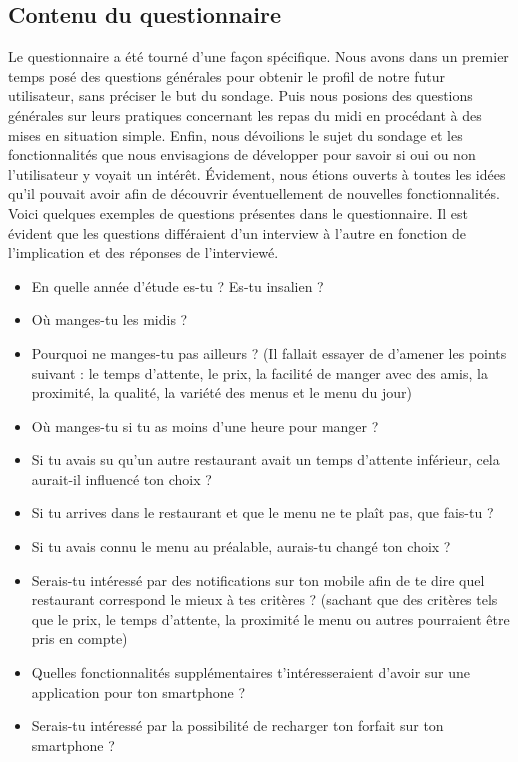 \subsection{Contenu du questionnaire}
Le questionnaire a été tourné d'une façon spécifique. Nous avons dans un 
premier temps posé des questions générales pour obtenir le profil de notre
futur utilisateur, sans préciser le but du sondage. Puis nous posions 
des questions générales sur leurs pratiques concernant les repas du midi
en procédant à des mises en situation simple. Enfin, nous dévoilions le
sujet du sondage et les fonctionnalités que nous envisagions de
développer pour savoir si oui ou non l'utilisateur y voyait un intérêt. 
Évidement, nous étions ouverts à toutes les idées qu'il pouvait avoir
afin de découvrir éventuellement de nouvelles fonctionnalités. \\
Voici quelques exemples de questions présentes dans le questionnaire. 
Il est évident que les questions différaient d'un interview à 
l'autre en fonction de l'implication et des réponses de l'interviewé. 
\begin{itemize}
\item En quelle année d'étude es-tu ? Es-tu insalien ?
\item Où manges-tu les midis ?
\item Pourquoi ne manges-tu pas ailleurs ? (Il fallait essayer de d'amener les points
suivant : le temps d'attente, le prix, la facilité de manger avec des amis,
la proximité, la qualité, la variété des menus et le menu du jour)
\item Où manges-tu si tu as moins d'une heure pour manger ?
\item Si tu avais su qu'un autre restaurant avait un temps d'attente inférieur, 
cela aurait-il influencé ton choix ? 
\item Si tu arrives dans le restaurant et que le menu ne te plaît pas,
que fais-tu ?
\item Si tu avais connu le menu au préalable, aurais-tu changé ton choix ?
\item Serais-tu intéressé par des notifications sur ton mobile afin de te dire 
quel restaurant correspond le mieux à tes critères ? (sachant que des 
critères tels que le prix, le temps d'attente, la proximité le menu ou autres
pourraient être pris en compte)
\item Quelles fonctionnalités supplémentaires t'intéresseraient d'avoir sur 
une application pour ton smartphone ?
\item Serais-tu intéressé par la possibilité de recharger ton forfait sur ton smartphone ?
\end{itemize}

